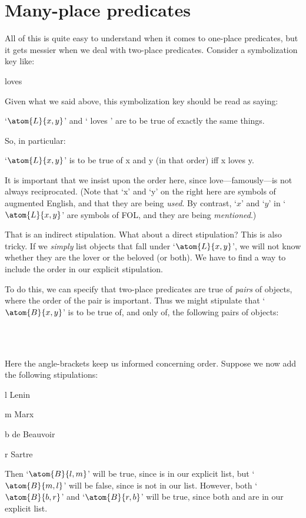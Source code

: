 \section{Many-place predicates}
All of this is quite easy to understand when it comes to one-place predicates, but it gets messier when we deal with two-place predicates. Consider a symbolization key like:
	\begin{ekey}
		\item[\atom{L}{x,y}]  loves 
	\end{ekey}
Given what we said above, this symbolization key should be read as saying:
	\begin{earg}
		\item[\textbullet] `$\atom{L}{x,y}$' and ` loves ' are to be true of exactly the same things.
	\end{earg}
So, in particular:
	\begin{earg}
		\item[\textbullet] `$\atom{L}{x,y}$' is to be true of x and y (in that order) iff x loves y.
	\end{earg}
It is important that we insist upon the order here, since love---famously---is not always reciprocated. (Note that `x' and `y' on the right here are symbols of augmented English, and that they are being \emph{used}. By contrast, `$x$' and `$y$' in `$\atom{L}{x,y}$' are symbols of FOL, and they are being \emph{mentioned}.)

That is an indirect stipulation. What about a direct stipulation? This is also tricky. If we \emph{simply} list objects that fall under `$\atom{L}{x,y}$', we will not know whether they are the lover or the beloved (or both). We have to find a way to include the order in our explicit stipulation.

To do this, we can specify that two-place predicates are true of \emph{pairs} of objects, where the order of the pair is important. Thus we might stipulate that `$\atom{B}{x,y}$' is to be true of, and only of, the following pairs of objects:
	\begin{center}
		\ntuple{Lenin, Marx}\\
		\ntuple{de Beauvoir, Sartre}\\
		\ntuple{Sartre, de Beauvoir}
	\end{center}
Here the angle-brackets keep us informed concerning order. Suppose we now add the following stipulations:
	\begin{ekey}
		\item[l] Lenin
		\item[m] Marx
		\item[b] de Beauvoir
		\item[r] Sartre
	\end{ekey}
Then `$\atom{B}{l,m}$' will be true, since  is in our explicit list, but `$\atom{B}{m,l}$' will be false, since  is not in our list. However, both `$\atom{B}{b,r}$' and `$\atom{B}{r,b}$' will be true, since both  and  are in our explicit list.

